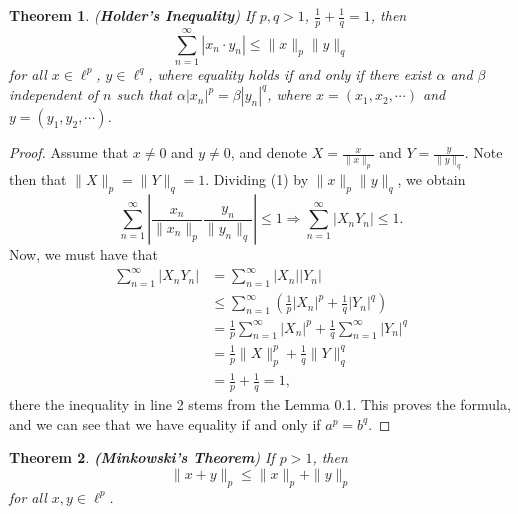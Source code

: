 \documentclass[12pt]{article}
\newtheorem{theorem}{Theorem}
\newcommand{\sumi}{\sum\limits_{n = 1}^{\infty}}
\newcommand{\lp}{\left(}
\newcommand{\rp}{\right)}
\newcommand{\vtf}{{\vspace{-25pt}}}
\begin{document}
\begin{theorem}
(\textbf{Holder's Inequality}) If $p, q > 1$, $\frac{1}{p} + \frac{1}{q} = 1$, then 
\begin{equation}
\sumi |x_n \cdot y_n| \leq \| x \|_p \| y \|_q 
\end{equation}
for all $x \in \ell^{p}$, $y \in \ell^{q}$, where equality holds if and only if there exist $\alpha$ and $\beta$ independent of $n$ such that $\alpha | x_n |^p = \beta | y_n |^q$, where $x = (x_1, x_2, \cdots)$ and $y = (y_1, y_2, \cdots)$. 
\end{theorem}
\vtf
\begin{proof}
Assume that $x \neq 0$ and $y \neq 0$, and denote $X = \frac{x}{\| x \|_p}$ and $Y = \frac{y}{\|y \|_q}$. Note then that $\|X \|_p = \| Y \|_q = 1$. Dividing (1) by $\| x \|_p \| y \|_q$, we obtain
\[ \sumi \left| \frac{x_n}{\| x_n \|_p }\frac{y_n}{\|y_n \|_q} \right| \leq 1 \Longrightarrow \sumi | X_n Y_n | \leq 1. \]
Now, we must have that 
\begin{align*}
\sumi |X_n Y_n | & = \sumi |X_n| |Y_n| \\
& \leq \sumi \lp \frac{1}{p} |X_n|^p + \frac{1}{q} |Y_n|^q \rp \\
& = \frac{1}{p} \sumi |X_n|^p + \frac{1}{q} \sumi |Y_n|^q \\
& = \frac{1}{p} \| X\|_p^p  + \frac{1}{q} \| Y \|_q^q \\
& = \frac{1}{p} + \frac{1}{q} = 1,
\end{align*}
there the inequality in line 2 stems from the Lemma 0.1. This proves the formula, and we can see that we have equality if and only if $a^p = b^q$. 
\end{proof}
\begin{theorem}
\textbf{(Minkowski's Theorem}) If $p > 1$, then 
\begin{equation}
\| x + y \|_p \leq \| x \|_p + \| y \|_p
\end{equation}
for all $x, y \in \ell^p$.
\end{theorem}
\vtf
\end{document}
